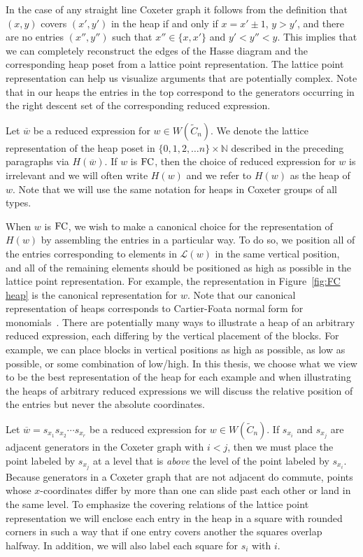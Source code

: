 In the case of any straight line Coxeter graph it follows from the definition that $(x,y)$ covers $(x',y')$ in the heap if and only if $x = x' \pm 1$, $y > y'$, and there are no entries $(x'', y'')$ such that $x'' \in \{x, x'\}$ and $y'< y'' < y$. This implies that we can completely reconstruct the edges of the Hasse diagram and the corresponding heap poset from a lattice point representation. The lattice point representation can help us visualize arguments that are potentially complex. Note that in our heaps the entries in the top correspond to the generators occurring in the right descent set of the corresponding reduced expression.

Let $\overline{w}$ be a reduced expression for $w \in W(\widetilde{C}_n)$. We denote the lattice representation of the heap poset in $\{0,1,2, \ldots n\} \times \mathbb{N}$ described in the preceding paragraphs via $H(\overline{w})$. If $w$ is $\mathrm{FC}$, then the choice of reduced expression for $w$ is irrelevant and we will often write $H(w)$ and we refer to $H(w)$ as the heap of $w$. Note that we will use the same notation for heaps in Coxeter groups of all types.

When $w$ is $\mathrm{FC}$, we wish to make a canonical choice for the representation of $H(w)$ by assembling the entries in a particular way. To do so, we position all of the entries corresponding to elements in $\mathcal{L}(w)$ in the same vertical position, and all of the remaining elements should be positioned as high as possible in the lattice point representation. For example, the representation in Figure~\ref{fig:FC heap} is the canonical representation for $w$. Note that our canonical representation of heaps corresponds to Cartier-Foata normal form for monomials~\cite{Cartier1969, Green2006a}. There are potentially many ways to illustrate a heap of an arbitrary reduced expression, each differing by the vertical placement of the blocks. For example, we can place blocks in vertical positions as high as possible, as low as possible, or some combination of low/high. In this thesis, we choose what we view to be the best representation of the heap for each example and when illustrating the heaps of arbitrary reduced expressions we will discuss the relative position of the entries but never the absolute coordinates. 

Let $\overline{w}=s_{x_1}s_{x_2}\cdots s_{x_r}$ be a reduced expression for $w \in W(\widetilde{C}_n)$. If $s_{x_i}$ and $s_{x_j}$ are adjacent generators in the Coxeter graph with $i<j$, then we must place the point labeled by $s_{x_j}$ at a level that is \emph{above} the level of the point labeled by $s_{x_i}$. Because generators in a Coxeter graph that are not adjacent do commute, points whose $x$-coordinates differ by more than one can slide past each other or land in the same level. To emphasize the covering relations of the lattice point representation we will enclose each entry in the heap in a square with rounded corners in such a way that if one entry covers another the squares overlap halfway. In addition, we will also label each square for $s_i$ with $i$.

